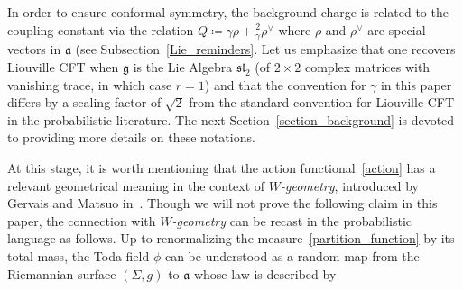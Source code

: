 \documentclass[AHL,Unicode,longabstracts,published]{cedram}
\newcommand{\frksl}{\mathfrak{sl}}
\newcommand{\frkg}{\mathfrak{g}}
\newcommand{\frka}{\mathfrak{a}}
\begin{document}
In order to ensure conformal symmetry, the background charge is related to the coupling constant via the relation $Q\coloneqq \gamma\rho+\frac2\gamma\rho^\vee$ where $\rho$ and $\rho^\vee$ are special vectors in $\frka$ (see Subsection~\ref{Lie_reminders}. Let us emphasize that one recovers Liouville CFT when $\frkg$ is the Lie Algebra $\frksl_2$ (of $2\times 2$ complex matrices with vanishing trace, in which case $r=1$) and that the convention for $\gamma$ in this paper differs by a scaling factor of $\sqrt{2}$ from the standard convention for Liouville CFT in the probabilistic literature. The next Section~\ref{section_background} is devoted to providing more details on these notations.


At this stage, it is worth mentioning that the action functional~\eqref{action} has a relevant geometrical meaning in the context of \emph{$W$-geometry}, introduced by Gervais and Matsuo in~\cite{GeMa92}. Though we will not prove the following claim in this paper, the connection with \emph{$W$-geometry} can be recast in the probabilistic language as follows. Up to renormalizing the measure~\eqref{partition_function} by its total mass, the Toda field $\phi$ can be understood as a random map from the Riemannian surface $(\Sigma,g)$ to $\frka$ whose law is described by
\end{document}
